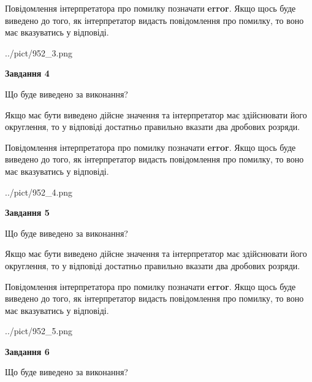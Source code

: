 \documentclass[12pt, ukrainian]{article}
\begin{document}
{\begin {Large}
Повідомлення інтерпретатора про помилку позначати \textbf{error}.
Якщо щось буде виведено до того, як інтерпретатор видасть повідомлення про помилку, 
то воно має вказуватись у відповіді. \par

\begin{center}
	{../pict/952_3.png}
\end{center}
\newpage

{\begin {center}\textbf{Завдання 4}\end {center}}\par
Що буде виведено за виконання? \par

Якщо має бути виведено дійсне значення та інтерпретатор має здійснювати його округлення, 
то у відповіді достатньо правильно вказати два дробових розряди.

Повідомлення інтерпретатора про помилку позначати \textbf{error}.
Якщо щось буде виведено до того, як інтерпретатор видасть повідомлення про помилку, 
то воно має вказуватись у відповіді. \par

\begin{center}
	{../pict/952_4.png}
\end{center}
\newpage

{\begin {center}\textbf{Завдання 5}\end {center}}\par
Що буде виведено за виконання? \par

Якщо має бути виведено дійсне значення та інтерпретатор має здійснювати його округлення, 
то у відповіді достатньо правильно вказати два дробових розряди.

Повідомлення інтерпретатора про помилку позначати \textbf{error}.
Якщо щось буде виведено до того, як інтерпретатор видасть повідомлення про помилку, 
то воно має вказуватись у відповіді. \par

\begin{center}
	{../pict/952_5.png}
\end{center}
\newpage

{\begin {center}\textbf{Завдання 6}\end {center}}\par
Що буде виведено за виконання? \par


\end{Large}}
\end{document}
